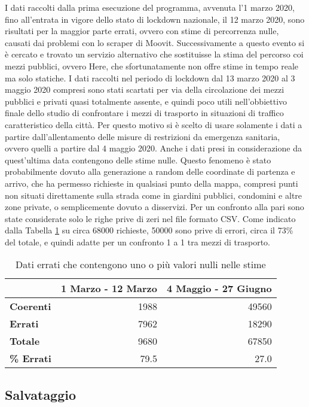 I dati raccolti dalla prima esecuzione del programma, avvenuta l'1 marzo 2020, fino all'entrata in vigore dello stato di lockdown nazionale, il 12 marzo 2020, sono risultati per la maggior parte errati, ovvero con stime di percorrenza nulle, causati dai problemi con lo scraper di Moovit. Successivamente a questo evento si è cercato e trovato un servizio alternativo che sostituisse la stima del percorso coi mezzi pubblici, ovvero Here, che sfortunatamente non offre stime in tempo reale ma solo statiche. I dati raccolti nel periodo di lockdown dal 13 marzo 2020 al 3 maggio 2020 compresi sono stati scartati per via della circolazione dei mezzi pubblici e privati quasi totalmente assente, e quindi poco utili nell'obbiettivo finale dello studio di confrontare i mezzi di trasporto in situazioni di traffico caratteristico della città. Per questo motivo si è scelto di usare solamente i dati a partire dall'allentamento delle misure di restrizioni da emergenza sanitaria, ovvero quelli a partire dal 4 maggio 2020. Anche i dati presi in considerazione da quest'ultima data contengono delle stime nulle. Questo fenomeno è stato probabilmente dovuto alla generazione a random delle coordinate di partenza e arrivo, che ha permesso richieste in qualsiasi punto della mappa, compresi punti non situati direttamente sulla strada come in giardini pubblici, condomini e altre zone private, o semplicemente dovuto a disservizi. Per un confronto alla pari sono state considerate solo le righe prive di zeri nel file formato CSV. Come indicato dalla Tabella \ref{table:1} su circa 68000 richieste, 50000 sono prive di errori, circa il 73\% del totale, e quindi adatte per un confronto 1 a 1 tra mezzi di trasporto.

\begin{table}
	\centering
	\begin{tabular}{ | l | r | r | }
		\hline
		& \textbf{1 Marzo - 12 Marzo} & \textbf{4 Maggio - 27 Giugno} \\
		\hline
		\textbf{Coerenti}& 1988 & 49560 \\  
		\textbf{Errati} & 7962 & 18290 \\
		\hline
		\textbf{Totale} & 9680 & 67850 \\
		\textbf{\% Errati} & 79.5 & 27.0 \\
		\hline
	\end{tabular}
	\caption{Dati errati che contengono uno o più valori nulli nelle stime}
	\label{table:1}
\end{table}

\subsection{Salvataggio}

